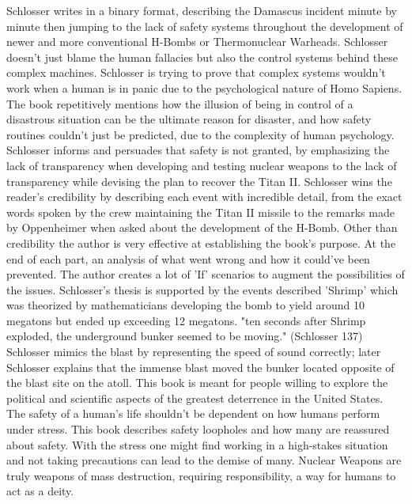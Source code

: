 \documentclass[12pt,letterpaper]{article}
\begin{document}
\begin{flushleft}
Schlosser writes in a binary format, describing the Damascus incident minute by minute then jumping to the lack of safety systems throughout the development of newer and more conventional H-Bombs or Thermonuclear Warheads. Schlosser doesn't just blame the human fallacies but also the control systems behind these complex machines. Schlosser is trying to prove that complex systems wouldn't work when a human is in panic due to the psychological nature of Homo Sapiens. The book repetitively mentions how the illusion of being in control of a disastrous situation can be the ultimate reason for disaster, and how safety routines couldn't just be predicted, due to the complexity of human psychology. Schlosser informs and persuades that safety is not granted, by emphasizing the lack of transparency when developing and testing nuclear weapons to the lack of transparency while devising the plan to recover the Titan II. Schlosser wins the reader's credibility by describing each event with incredible detail, from the exact words spoken by the crew maintaining the Titan II missile to the remarks made by Oppenheimer when asked about the development of the H-Bomb. Other than credibility the author is very effective at establishing the book's purpose. At the end of each part, an analysis of what went wrong and how it could've been prevented. The author creates a lot of 'If' scenarios to augment the possibilities of the issues. Schlosser's thesis is supported by the events described 'Shrimp' which was theorized by mathematicians developing the bomb to yield around 10 megatons but ended up exceeding 12 megatons. "ten seconds after Shrimp exploded, the underground bunker seemed to be moving." (Schlosser 137) Schlosser mimics the blast by representing the speed of sound correctly; later Schlosser explains that the immense blast moved the bunker located opposite of the blast site on the atoll. This book is meant for people willing to explore the political and scientific aspects of the greatest deterrence in the United States. The safety of a human's life shouldn't be dependent on how humans perform under stress. This book describes safety loopholes and how many are reassured about safety. With the stress one might find working in a high-stakes situation and not taking precautions can lead to the demise of many. Nuclear Weapons are truly weapons of mass destruction, requiring responsibility, a way for humans to act as a deity. 

\newpage

\printbibliography


\end{flushleft}
\end{document}
